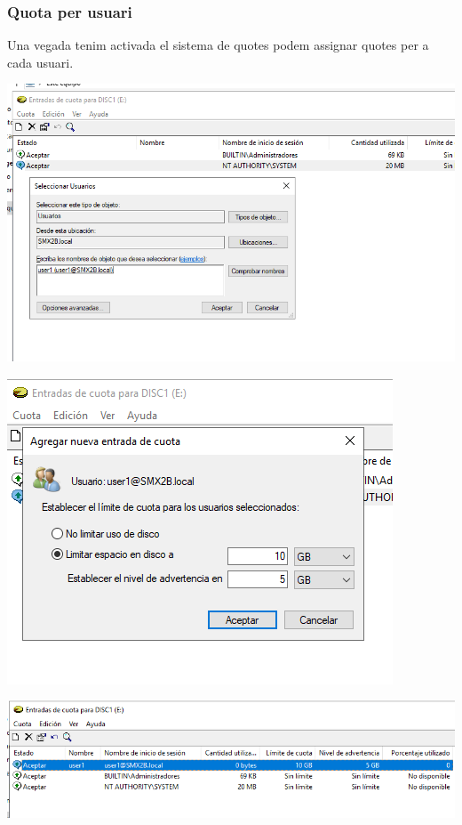 \documentclass[
  a4paper,
]{article}
\begin{document}
\subsubsection{Quota per usuari}\label{quota-per-usuari}

Una vegada tenim activada el sistema de quotes podem assignar quotes per
a cada usuari.

\includegraphics{png/CuotaNuevaUsuari1.png}

\includegraphics{png/CuotaNuevaUsuari2.png}

\includegraphics{png/CuotaNuevaUsuari3.png}
\end{document}
